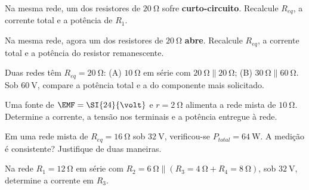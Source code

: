 \begin{questao}[2]{}

Na mesma rede, um dos resistores de $\SI{20}{\ohm}$ sofre
\textbf{curto-circuito}. Recalcule $R_{eq}$, a corrente total e a potência de
$R_1$.


\end{questao}
\begin{questao}[2]{}

Na mesma rede, agora um dos resistores de $\SI{20}{\ohm}$ \textbf{abre}.
Recalcule $R_{eq}$, a corrente total e a potência do resistor remanescente.


\end{questao}
\begin{questao}[2]{}

Duas redes têm $R_{eq}=\SI{20}{\ohm}$: (A) $\SI{10}{\ohm}$ em série com
$\SI{20}{\ohm}\parallel\SI{20}{\ohm}$; (B) $\SI{30}{\ohm}\parallel\SI{60}{\ohm}$.
Sob $\SI{60}{\volt}$, compare a potência total e a do componente mais
solicitado.


\end{questao}
\begin{questao}[2]{}

Uma fonte de $\EMF=\SI{24}{\volt}$ e $r=\SI{2}{\ohm}$ alimenta a rede mista de
$\SI{10}{\ohm}$. Determine a corrente, a tensão nos terminais e a potência
entregue à rede.


\end{questao}
\begin{questao}[2]{}

Em uma rede mista de $R_{eq}=\SI{16}{\ohm}$ sob $\SI{32}{\volt}$, verificou-se
$P_{total}=\SI{64}{\watt}$. A medição é consistente? Justifique de duas
maneiras.


\end{questao}
\begin{questao}[2]{}

Na rede $R_1=\SI{12}{\ohm}$ em série com $R_2=\SI{6}{\ohm}\parallel
(R_3=\SI{4}{\ohm}+R_4=\SI{8}{\ohm})$, sob $\SI{32}{\volt}$, determine a
corrente em $R_3$.


\end{questao}

